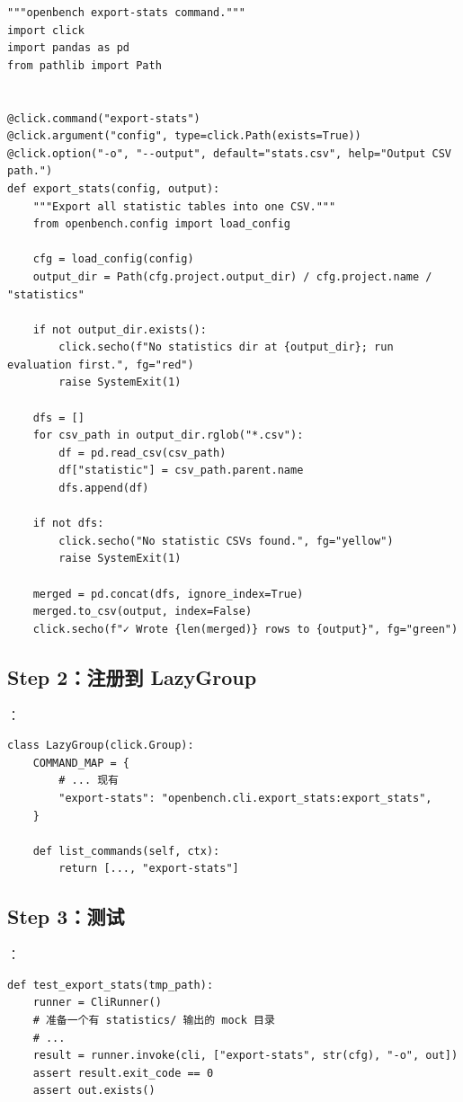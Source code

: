 \begin{verbatim}
"""openbench export-stats command."""
import click
import pandas as pd
from pathlib import Path


@click.command("export-stats")
@click.argument("config", type=click.Path(exists=True))
@click.option("-o", "--output", default="stats.csv", help="Output CSV path.")
def export_stats(config, output):
    """Export all statistic tables into one CSV."""
    from openbench.config import load_config

    cfg = load_config(config)
    output_dir = Path(cfg.project.output_dir) / cfg.project.name / "statistics"

    if not output_dir.exists():
        click.secho(f"No statistics dir at {output_dir}; run evaluation first.", fg="red")
        raise SystemExit(1)

    dfs = []
    for csv_path in output_dir.rglob("*.csv"):
        df = pd.read_csv(csv_path)
        df["statistic"] = csv_path.parent.name
        dfs.append(df)

    if not dfs:
        click.secho("No statistic CSVs found.", fg="yellow")
        raise SystemExit(1)

    merged = pd.concat(dfs, ignore_index=True)
    merged.to_csv(output, index=False)
    click.secho(f"✓ Wrote {len(merged)} rows to {output}", fg="green")
\end{verbatim}

\subsection{Step 2：注册到 LazyGroup}

：

\begin{verbatim}
class LazyGroup(click.Group):
    COMMAND_MAP = {
        # ... 现有
        "export-stats": "openbench.cli.export_stats:export_stats",
    }

    def list_commands(self, ctx):
        return [..., "export-stats"]
\end{verbatim}

\subsection{Step 3：测试}

：

\begin{verbatim}
def test_export_stats(tmp_path):
    runner = CliRunner()
    # 准备一个有 statistics/ 输出的 mock 目录
    # ...
    result = runner.invoke(cli, ["export-stats", str(cfg), "-o", out])
    assert result.exit_code == 0
    assert out.exists()
\end{verbatim}

